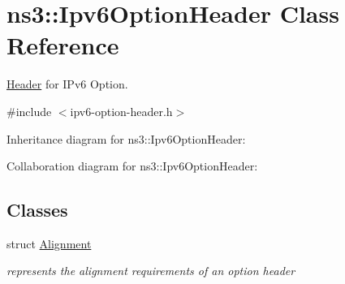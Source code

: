 \hypertarget{classns3_1_1Ipv6OptionHeader}{}\section{ns3\+:\+:Ipv6\+Option\+Header Class Reference}
\label{classns3_1_1Ipv6OptionHeader}


\hyperlink{classns3_1_1Header}{Header} for I\+Pv6 Option.  




{\ttfamily \#include $<$ipv6-\/option-\/header.\+h$>$}



Inheritance diagram for ns3\+:\+:Ipv6\+Option\+Header\+:


Collaboration diagram for ns3\+:\+:Ipv6\+Option\+Header\+:
\subsection*{Classes}
\begin{DoxyCompactItemize}
\item 
struct \hyperlink{structns3_1_1Ipv6OptionHeader_1_1Alignment}{Alignment}
\begin{DoxyCompactList}\small\item\em represents the alignment requirements of an option header \end{DoxyCompactList}\end{DoxyCompactItemize}

